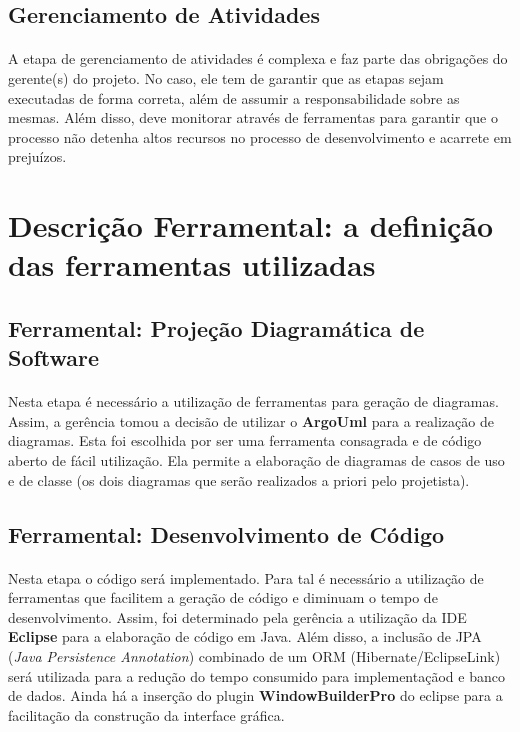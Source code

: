\documentclass[12pt,a4paper]{article}
\begin{document}
	\subsection{Gerenciamento de Atividades}
	\paragraph{}A etapa de gerenciamento de atividades é complexa e faz parte das obrigações do gerente(s) do projeto. No caso, ele tem de garantir que as etapas sejam executadas de forma correta, além de assumir a responsabilidade sobre as mesmas. Além disso, deve monitorar através de ferramentas para garantir que o processo não detenha altos recursos no processo de desenvolvimento e acarrete em prejuízos.
 
	\section{Descrição Ferramental: a definição das ferramentas utilizadas}
	\subsection{Ferramental: Projeção Diagramática de Software}
	\paragraph{} Nesta etapa é necessário a utilização de ferramentas para geração de diagramas. Assim, a gerência tomou a decisão de utilizar o \textbf{ArgoUml}  para a realização de diagramas. Esta foi escolhida por ser uma ferramenta consagrada e de código aberto de fácil utilização. Ela permite a elaboração de diagramas de casos de uso e de classe (os dois diagramas que serão realizados a priori pelo projetista).
	\subsection{Ferramental: Desenvolvimento de Código}
	\paragraph{} Nesta etapa o código será implementado. Para tal é necessário a utilização de ferramentas que facilitem a geração de código e diminuam o tempo de desenvolvimento. Assim, foi determinado pela gerência a utilização da IDE \textbf{Eclipse} para a elaboração de código em Java. Além disso, a inclusão de JPA (\textit{Java Persistence Annotation}) combinado de um ORM (Hibernate/EclipseLink) será utilizada para a redução do tempo consumido para implementaçãod e banco de dados. Ainda há a inserção do plugin \textbf{WindowBuilderPro} do eclipse para a facilitação da construção da interface gráfica. 
\end{document}
